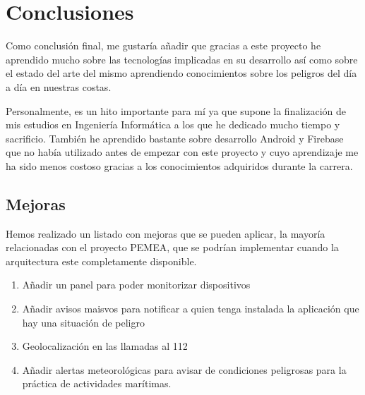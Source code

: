 \chapter{Conclusiones}
\label{conclusiones}


Como conclusión final, me gustaría añadir que gracias a este proyecto he aprendido mucho sobre las tecnologías implicadas en su desarrollo así como sobre el estado del arte del mismo aprendiendo conocimientos sobre los peligros del día a día en nuestras costas.

Personalmente, es un hito importante para mí ya que supone la finalización de mis estudios en Ingeniería Informática a los que he dedicado mucho tiempo y sacrificio. También he aprendido bastante sobre desarrollo Android y Firebase que no había utilizado antes de empezar con este proyecto y cuyo aprendizaje me ha sido menos costoso gracias a los conocimientos adquiridos durante la carrera.


\section{Mejoras}

Hemos realizado un listado con mejoras que se pueden aplicar, la mayoría relacionadas con el proyecto PEMEA, que se podrían implementar cuando la arquitectura este completamente disponible.

\begin{enumerate}
\item Añadir un panel para poder monitorizar dispositivos
\item Añadir avisos maisvos para notificar a quien tenga instalada la aplicación que hay una situación de peligro
\item Geolocalización en las llamadas al 112
\item Añadir alertas meteorológicas para avisar de condiciones peligrosas para la práctica de actividades marítimas.
\end{enumerate}
